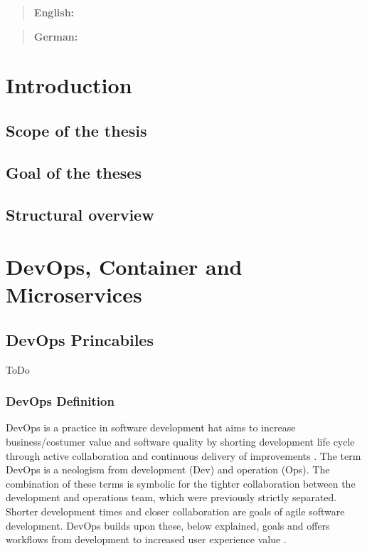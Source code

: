 \documentclass[12pt, a4paper]{article}
\begin{document}


\tableofcontents
{}
\setcounter{lastroman}{\value{page}}

\maketitle
\begin{abstract}
    \textbf{English:} \lipsum[20]
\end{abstract}
\begin{abstract}
    \textbf{German:} \lipsum[20]
\end{abstract}
\newpage
\section{ Introduction}
    \subsection{Scope of the thesis}
    \subsection{Goal of the theses}
    \subsection{Structural overview}
    \newpage
\section{DevOps, Container and Microservices}
    \subsection{DevOps Princabiles}
    ToDo
        \subsubsection{DevOps Definition}
        DevOps is a practice in software development hat aims to increase business/costumer value and software quality by shorting development life cycle through active collaboration and continuous delivery of improvements \cite{base_devops}. The term DevOps is a neologism from development (Dev) and operation (Ops). The combination of these terms is symbolic for the tighter collaboration between the development and operations team, which were previously strictly separated. Shorter development times and closer collaboration are goals of agile software development. DevOps builds upon these, below explained, goals and offers workflows from development to increased user experience value \cite{azuredevops}.
\end{document}
